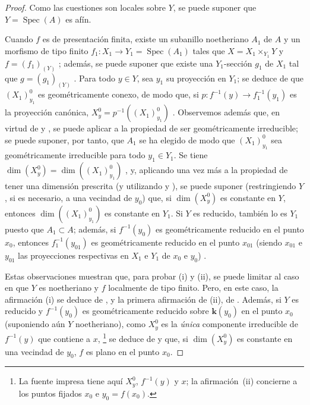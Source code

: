 \begin{proof}
Como las cuestiones son locales sobre $Y$, se puede suponer que $Y=\operatorname{Spec}(A)$ es afín.

Cuando $f$ es de presentación finita, existe un subanillo noetheriano $A_1$ de $A$ y un morfismo de tipo finito $f_1:X_1\to Y_1=\operatorname{Spec}(A_1)$ tales que $X=X_1\times_{Y_1}Y$ y $f=(f_1)_{(Y)}$ ; además, se puede suponer que existe una $Y_1$-sección $g_1$ de $X_1$ tal que $g=(g_1)_{(Y)}$ .
Para todo $y\in Y$, sea $y_1$ su proyección en $Y_1$; se deduce de  que $(X_1)_{y_1}^0$ es geométricamente conexo, de modo que, si $p:f^{-1}(y)\to f_1^{-1}(y_1)$ es la proyección canónica, $X_y^0=p^{-1}((X_1)_{y_1}^0)$ .
Observemos además que, en virtud de  y , se puede aplicar  a la propiedad de ser geométricamente irreducible; se puede suponer, por tanto, que $A_1$ se ha elegido de modo que $(X_1)_{y_1}^0$ sea geométricamente irreducible para todo $y_1\in Y_1$.
Se tiene $\dim(X_y^0)=\dim((X_1)_{y_1}^0)$ , y, aplicando una vez más  a la propiedad de tener una dimensión prescrita (y utilizando  y ), se puede suponer (restringiendo $Y$, si es necesario, a una vecindad de $y_0$) que, si $\dim(X_y^0)$ es constante en $Y$, entonces $\dim((X_1)_{y_1}^0)$ es constante en $Y_1$.
Si $Y$ es reducido, también lo es $Y_1$ puesto que $A_1\subset A$; además, si $f^{-1}(y_0)$ es geométricamente reducido en el punto $x_0$, entonces $f_1^{-1}(y_{01})$ es geométricamente reducido en el punto $x_{01}$ (siendo $x_{01}$ e $y_{01}$ las proyecciones respectivas en $X_1$ e $Y_1$ de $x_0$ e $y_0$) .

Estas observaciones muestran que, para probar (i) y (ii), se puede limitar al caso en que $Y$ es noetheriano y $f$ localmente de tipo finito.
Pero, en este caso, la afirmación (i) se deduce de , y la primera afirmación de (ii), de .
Además, si $Y$ es reducido y $f^{-1}(y_0)$ es geométricamente reducido sobre $\boldsymbol{k}(y_0)$ en el punto $x_0$ (suponiendo aún $Y$
noetheriano), como $X_y^0$ es la \emph{única} componente irreducible de $f^{-1}(y)$ que contiene a $x$,
\footnote{La fuente impresa tiene aquí $X_y^0$, $f^{-1}(y)$ y $x$; la afirmación~(ii) concierne a los puntos fijados $x_0$ e $y_0=f(x_0)$.} se deduce de  y  que, si $\dim(X_y^0)$ es constante en una vecindad de $y_0$, $f$ es plano en el punto $x_0$.


\end{proof}
